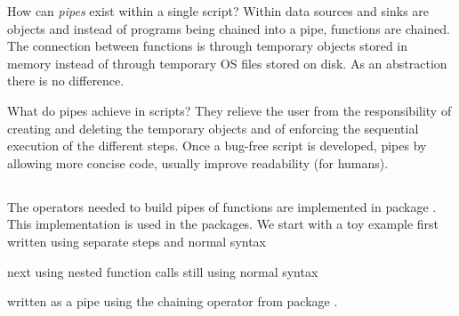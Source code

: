 \documentclass[krantz2]{krantz}\usepackage{knitr}%
\begin{document}
How can \emph{pipes} exist within a single \Rlang script? Within \Rlang data sources and sinks are \Rlang objects and instead of programs being chained into a pipe, functions are chained. The connection between functions is through temporary \Rlang objects stored in memory instead of through temporary OS files stored on disk. As an abstraction there is no difference.

What do pipes achieve in \Rlang scripts? They relieve the user from the responsibility of creating and deleting the temporary objects and of enforcing the sequential execution of the different steps. Once a bug-free script is developed, pipes by allowing more concise code, usually improve readability (for humans).

\subsection{}

The operators needed to build pipes of \Rlang functions are implemented in package . This implementation is used in the  packages.
We start with a toy example first written using separate steps and normal \Rlang syntax

\begin{knitrout}\footnotesize
{}\color{fgcolor}\begin{kframe}
\begin{alltt}
 \hlkwb{<-} \hlopt{:}
 \hlkwb{<-} 
 \hlkwb{<-} 
 
\end{alltt}
\end{kframe}
\end{knitrout}

next using nested function calls still using normal \Rlang syntax

\begin{knitrout}\footnotesize
{}\color{fgcolor}\begin{kframe}
\begin{alltt}
 \hlkwb{<-} \hlstd{(}
\end{alltt}
\end{kframe}
\end{knitrout}

written as a pipe using the chaining operator from package .
\end{document}

